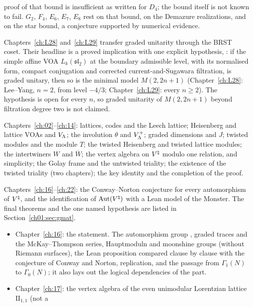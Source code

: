 \begin{description}
\begin{itemize}
    proof of that bound is insufficient as written for $D_4$; the bound itself is not known to fail. $G_2$, $F_4$, $E_6$,
    $E_7$, $E_8$ rest on that bound, on the Demazure realizations, and on the star bound, a conjecture supported by
    numerical evidence.
  \end{itemize}
  Chapters~\ref{ch:L28} and~\ref{ch:L29} transfer graded unitarity through the BRST coset. Their headline is a
  proved implication with one explicit hypothesis, : if the simple affine VOA $L_k(\mathfrak{sl}_2)$ at the
  boundary admissible level, with its normalised form, compact conjugation and corrected current-and-Sugawara
  filtration, is graded unitary, then so is the minimal model $M(2,2n+1)$ (Chapter~\ref{ch:L28}: Lee--Yang, $n=2$,
  from level $-4/3$; Chapter~\ref{ch:L29}: every $n\ge2$). The hypothesis  is open for every $n$, so graded
  unitarity of $M(2,2n+1)$ beyond filtration degree two is not claimed.
\item[Part VII, The Moonshine module.] Chapters~\ref{ch:02}--\ref{ch:14}: lattices, codes and the
  Leech lattice; Heisenberg and lattice VOAs and $V_{\Lambda}$; the involution $\theta$ and
  $V_{\Lambda}^+$; graded dimensions and $J$; twisted modules and the module $T$; the twisted Heisenberg
  and twisted lattice modules; the intertwiners $W$ and $\overline W$; the vertex algebra on ${V^{\natural}}$
  modulo one relation, and simplicity; the Golay frame and the untwisted triality; the existence of
  the twisted triality (two chapters); the key identity and the completion of the proof.
\item[Part VIII, Monstrous moonshine.] Chapters~\ref{ch:16}--\ref{ch:22}: the Conway--Norton conjecture for every
  automorphism of ${V^{\natural}}$, and the identification of $\operatorname{Aut}({V^{\natural}})$ with a Lean model of the Monster. The final theorems
  and the one named hypothesis  are listed in Section~\ref{ch01:sec:gmat}.
  \begin{itemize}
  \item Chapter~\ref{ch:16}: the statement. The automorphism group , graded traces and the McKay--Thompson
    series, Hauptmoduln and moonshine groups (without Riemann surfaces), the Lean proposition
     compared clause by clause with the conjecture of Conway and Norton, replication, and
    the passage from $\Gamma_1(N)$ to $\Gamma_0(N)$; it also lays out the logical dependencies of the part.
  \item Chapter~\ref{ch:17}: the vertex algebra of the even unimodular Lorentzian lattice $\mathrm{II}_{1,1}$ (not a

\end{itemize}
\end{description}
